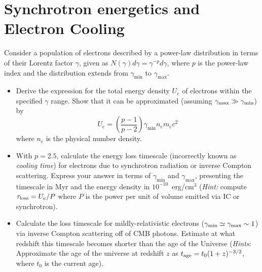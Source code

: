 \section{Synchrotron energetics and Electron Cooling}

Consider a population of electrons described by a power-law distribution in terms of their Lorentz factor $\gamma$, given as $N(\gamma)d\gamma = \gamma^{-p}d\gamma$, where $p$ is the power-law index and the distribution extends from $\gamma_{\text{min}}$ to $\gamma_{\text{max}}$.

\begin{itemize}
\item Derive the expression for the total energy density $U_e$ of electrons within the specified $\gamma$ range. Show that it can be approximated (assuming $\gamma_{\rm max} \gg \gamma_{\rm min}$) by $$U_e = \left(\frac{p-1}{p-2}\right) \gamma_{\text{min}} n_e m_e c^2$$
%
where $n_e$ is the physical number density.

\item With $p = 2.5$, calculate the energy loss timescale (incorrectly known as \emph{cooling time}) for electrons due to synchrotron radiation or inverse Compton scattering. Express your answer in terms of $\gamma_{\text{min}}$ and $\gamma_{\text{max}}$, presenting the timescale in Myr and the energy density in $10^{-10}$~erg/cm$^3$ (\emph{Hint:} compute $\tau_{\rm loss} = U_e / P$ where $P$ is the power per unit of volume emitted via IC or synchrotron).

\item Calculate the loss timescale for mildly-relativistic electrons ($\gamma_{\rm min} \simeq \gamma_{\rm max} \sim 1$) via inverse Compton scattering off of CMB photons. Estimate at what redshift this timescale becomes shorter than the age of the Universe (\emph{Hints}: Approximate the age of the universe at redshift $z$ as $t_{\rm age} = t_0 (1+z)^{-3/2}$, where $t_0$ is the current age).

\end{itemize}
